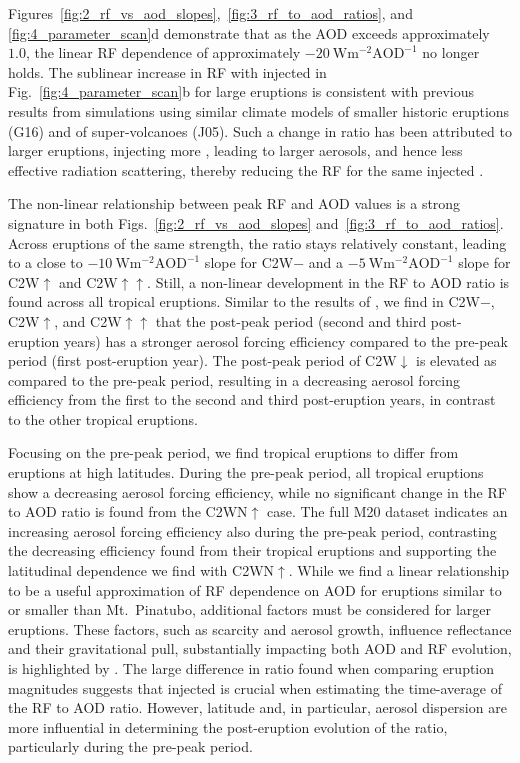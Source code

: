 \documentclass[draft]{agujournal2019}
\begin{document}
Figures~\ref{fig:2_rf_vs_aod_slopes},~\ref{fig:3_rf_to_aod_ratios}, and
\ref{fig:4_parameter_scan}d demonstrate that as the AOD exceeds approximately \(1.0\),
the linear RF dependence of approximately
\(\SI{-20}{\watt\metre^{-2}\mathrm{AOD}^{-1}}\) no longer holds. The sublinear increase
in RF with injected  in Fig.~\ref{fig:4_parameter_scan}b for large eruptions is
consistent with previous results from simulations using similar climate models of
smaller historic eruptions (G16) and of super-volcanoes (J05). Such a change in ratio
has been attributed to larger eruptions, injecting more , leading to larger
aerosols, and hence less effective radiation scattering, thereby reducing the RF for the
same injected  \cite{english2013, timmreck2010, timmreck2018}.

The non-linear relationship between peak RF and AOD values is a strong signature in both
Figs.~\ref{fig:2_rf_vs_aod_slopes} and~\ref{fig:3_rf_to_aod_ratios}. Across eruptions of
the same strength, the ratio stays relatively constant, leading to a close to
\(\SI{-10}{\watt\metre^{-2}\mathrm{AOD}^{-1}}\) slope for C2W\(-\) and a
\(\SI{-5}{\watt\metre^{-2}\mathrm{AOD}^{-1}}\) slope for C2W\(\uparrow\) and
C2W\(\uparrow\uparrow\). Still, a non-linear development in the RF to AOD ratio is found
across all tropical eruptions. Similar to the results of , we find
in C2W\(-\), C2W\(\uparrow\), and C2W\(\uparrow\uparrow\) that the post-peak period
(second and third post-eruption years) has a stronger aerosol forcing efficiency
compared to the pre-peak period (first post-eruption year). The post-peak period of
C2W\(\downarrow\) is elevated as compared to the pre-peak period, resulting in a
decreasing aerosol forcing efficiency from the first to the second and third
post-eruption years, in contrast to the other tropical eruptions.

Focusing on the pre-peak period, we find tropical eruptions to differ from eruptions at
high latitudes. During the pre-peak period, all tropical eruptions show a decreasing
aerosol forcing efficiency, while no significant change in the RF to AOD ratio is found
from the C2WN\(\uparrow\) case. The full M20 dataset indicates an increasing aerosol
forcing efficiency also during the pre-peak period, contrasting the decreasing
efficiency found from their tropical eruptions and supporting the latitudinal dependence
we find with C2WN\(\uparrow\). While we find a linear relationship to be a useful
approximation of RF dependence on AOD for eruptions similar to or smaller than Mt.\
Pinatubo, additional factors must be considered for larger eruptions. These factors,
such as \ce{OH} scarcity and aerosol growth, influence reflectance and their
gravitational pull, substantially impacting both AOD and RF evolution, is highlighted by
\citeA{timmreck2010}. The large difference in ratio found when comparing eruption
magnitudes suggests that injected \ce{SO2} is crucial when estimating the time-average
of the RF to AOD ratio. However, latitude and, in particular, aerosol dispersion are
more influential in determining the post-eruption evolution of the ratio, particularly
during the pre-peak period.
\end{document}
